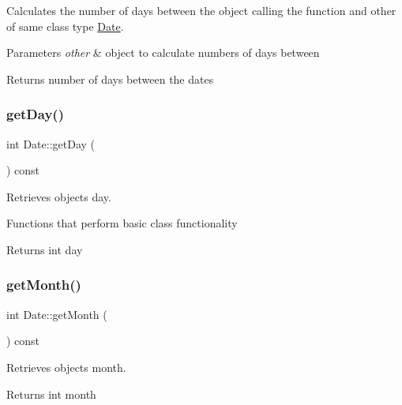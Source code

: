 Calculates the number of days between the object calling the function and other of same class type \hyperlink{class_date}{Date}. 


\begin{DoxyParams}{Parameters}
{\em other} & object to calculate numbers of days between\\
\hline
\end{DoxyParams}
\begin{DoxyReturn}{Returns}
number of days between the dates 
\end{DoxyReturn}
\mbox{\label{group___date_ga0f253815240e70f4c39cb93cc68bd3f4}} 
\subsubsection{\texorpdfstring{get\+Day()}{getDay()}}
{\footnotesize\ttfamily int Date\+::get\+Day (\begin{DoxyParamCaption}{ }\end{DoxyParamCaption}) const}



Retrieves object\textquotesingle{}s day. 

Functions that perform basic class functionality \begin{DoxyReturn}{Returns}
int day 
\end{DoxyReturn}
\mbox{\label{group___date_ga332f6e3a2f6a40d73742b6dab7be0f64}} 
\subsubsection{\texorpdfstring{get\+Month()}{getMonth()}}
{\footnotesize\ttfamily int Date\+::get\+Month (\begin{DoxyParamCaption}{ }\end{DoxyParamCaption}) const}



Retrieves object\textquotesingle{}s month. 

\begin{DoxyReturn}{Returns}
int month 
\end{DoxyReturn}
\mbox{\label{group___date_ga8b0869f34c2b38d108ab83ee2e770e5d}} 
